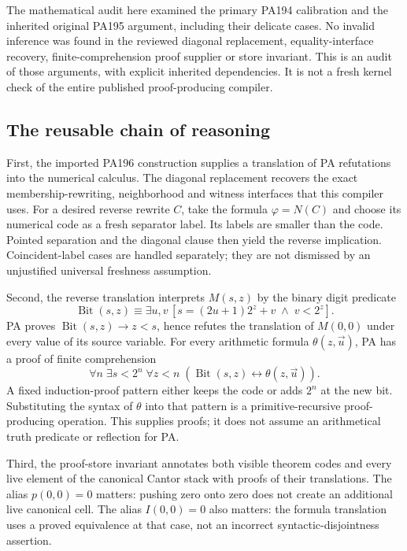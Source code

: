 \documentclass[11pt,letterpaper]{article}
\begin{document}
The mathematical audit here examined the primary PA194 calibration and
the inherited original PA195 argument, including their delicate cases.
No invalid inference was found in the reviewed diagonal replacement,
equality-interface recovery, finite-comprehension proof supplier or store
invariant. This is an audit of those arguments, with explicit inherited
dependencies. It is not a fresh kernel check of the entire published
proof-producing compiler.

\subsection{The reusable chain of reasoning}

First, the imported PA196 construction supplies a translation of PA
refutations into the numerical calculus. The diagonal replacement recovers
the exact membership-rewriting, neighborhood and witness interfaces that
this compiler uses. For a desired reverse rewrite $C$, take the formula
$\varphi=N(C)$ and choose its numerical code as a fresh separator label.
Its labels are smaller than the code. Pointed separation and the diagonal
clause then yield the reverse implication. Coincident-label cases are
handled separately; they are not dismissed by an unjustified universal
freshness assumption.

Second, the reverse translation interprets $M(s,z)$ by the binary digit
predicate
\[
 \operatorname{Bit}(s,z)\equiv
 \exists u,v\,[s=(2u+1)2^z+v\;\wedge\;v<2^z].
\]
PA proves $\operatorname{Bit}(s,z)\to z<s$, hence refutes the translation
of $M(0,0)$ under every value of its source variable. For every arithmetic
formula $\theta(z,\vec u)$, PA has a proof of finite comprehension
\[
 \forall n\;\exists s<2^n\;\forall z<n\;
       (\operatorname{Bit}(s,z)\leftrightarrow\theta(z,\vec u)).
 \tag{3}
\]
A fixed induction-proof pattern either keeps the code or adds $2^n$ at
the new bit. Substituting the syntax of $\theta$ into that pattern is a
primitive-recursive proof-producing operation. This supplies proofs;
it does not assume an arithmetical truth predicate or reflection for PA.

Third, the proof-store invariant annotates both visible theorem codes
and every live element of the canonical Cantor stack with proofs of
their translations. The alias $p(0,0)=0$ matters: pushing zero onto zero
does not create an additional live canonical cell. The alias $I(0,0)=0$
also matters: the formula translation uses a proved equivalence at that
case, not an incorrect syntactic-disjointness assertion.
\end{document}
